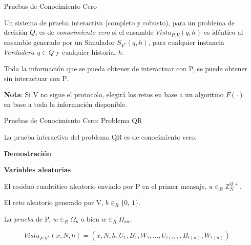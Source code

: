 \documentclass{beamer}
\begin{document}
\begin{frame}{Pruebas de Conocimiento Cero}
	\begin{definition}
		Un sistema de prueba interactiva (completo y robusto), para un problema de decisión $Q$, es de \textit{conocimiento cero} si el ensamble $Vista_{P,V}(q,h)$ es idéntico al ensamble generado por un Simulador $S_{V^*}(q,h)$, para cualquier instancia $Verdadera$ $q\in Q$ y cualquier historial $h$.
	\end{definition}

	Toda la información que se pueda obtener de interactuar con P, se puede obtener sin interactuar con P.
	
	{\small\textbf{Nota}: Si V no sigue el protocolo, elegirá los retos en base a un algoritmo $F(\cdot)$ en base a toda la información disponible.}
\end{frame}



\begin{frame}{Pruebas de Conocimiento Cero: Problema QR}
	\begin{theorem}
		La prueba interactiva del problema QR es de conocimiento cero.
	\end{theorem}
	\textbf{Demostración}
	
	\textbf{Variables aleatorias}
	\begin{description}[Wi]
		\item[$U_i$] El residuo cuadrático aleatorio enviado por P en el primer mensaje, $u \in_R \mathbb{Z}^{Q+}_N$.
		
		\item[$B_i$] El reto aleatorio generado por V, $b \in_R \{0,\,1\}$.
		
		\item[$W_i$] La \textit{prueba} de P, $w \in_R \Omega_u$ o bien $w \in_R \Omega_{xu}$.
	\end{description}

	\[  Vista_{P,V^*}(x,N,h) = (x,N,h,U_1,B_1,W_1,\dots , U_{t(n)}, B_{t(n)}, W_{t(n)}) \]
\end{frame}
\end{document}
